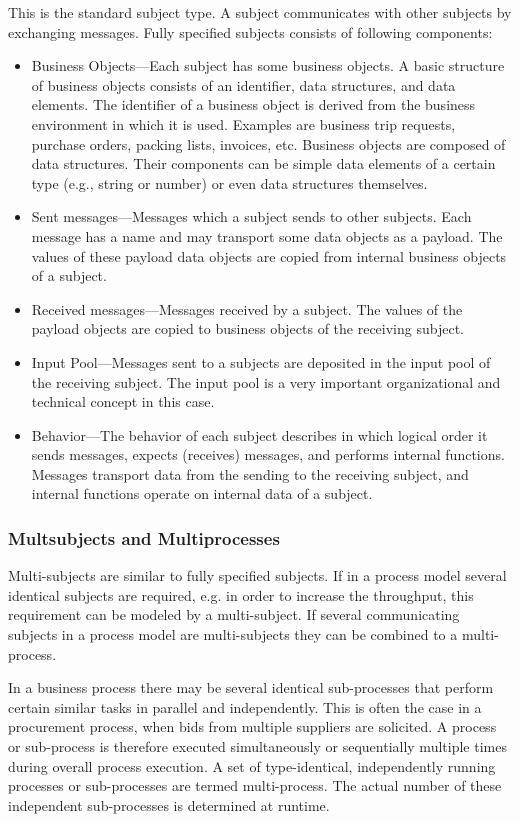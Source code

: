 This is the standard subject type. A subject communicates with other subjects by exchanging messages. Fully specified subjects consists of following components:

\begin{itemize}
	\item Business Objects---Each subject has some business objects. A basic structure of business objects consists of an identifier, data structures, and data elements. The identifier of a business object is derived from the business environment in which it is used. Examples are business trip requests, purchase orders, packing lists, invoices, etc. Business objects are composed of data structures. Their components can be simple data elements of a certain type (e.g., string or number) or even data structures themselves. 
	\item Sent messages---Messages which a subject sends to other subjects. Each message has a name and may transport some data objects as a payload. The values of these payload data objects are copied from internal business objects of a subject.
	\item Received messages---Messages received by a subject. The values of the payload objects are copied to business objects of the receiving subject.
	\item Input Pool---Messages sent to a subjects are deposited in the input pool of the receiving subject. The input pool is a very important organizational and technical concept in this case.
	\item Behavior---The behavior of each subject describes in which logical order it sends messages, expects (receives) messages, and performs internal functions. Messages transport data from the sending to the receiving subject, and internal functions operate on internal data of a subject. 
\end{itemize}


\subsubsection{Multsubjects and Multiprocesses}

Multi-subjects are similar to fully specified subjects. If in a process model several identical subjects are required, e.g. in order to increase the throughput, this requirement can be modeled by a multi-subject. If several communicating subjects in a process model are multi-subjects they can be combined to a multi-process.

In a business process there may be several identical sub-processes that perform certain similar tasks in parallel and independently. This is often the case in a procurement process, when bids from multiple suppliers are solicited. A process or sub-process is therefore executed simultaneously or sequentially multiple times during overall process execution. A set of type-identical, independently running processes or sub-processes are termed multi-process. The actual number of these independent sub-processes is determined at runtime.

